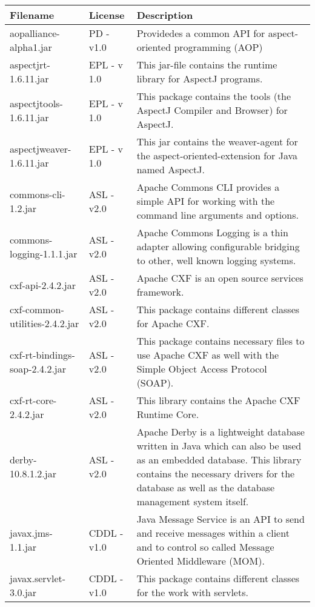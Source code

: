 \begin{center}
\begin{longtable}{|p{}|p{}|p{}|}
\hline 
Filename & License & Description\\
\hline
\hline 
aopalliance-alpha1.jar & PD - v1.0 & Providedes a common API for aspect-oriented programming (AOP)\\
\hline 
aspectjrt-1.6.11.jar & EPL - v 1.0 & This jar-file contains the runtime library for AspectJ programs.\\
\hline 
aspectjtools-1.6.11.jar & EPL - v 1.0 & This package contains the tools (the AspectJ Compiler and Browser) for AspectJ.\\
\hline 
aspectjweaver-1.6.11.jar & EPL - v 1.0 & This jar contains the weaver-agent for the aspect-oriented-extension for Java named AspectJ.\\
\hline 
commons-cli-1.2.jar & ASL - v2.0 & Apache Commons CLI provides a simple API for working with the command line arguments and options.\\
\hline 
commons-logging-1.1.1.jar & ASL - v2.0 & Apache Commons Logging is a thin adapter allowing configurable bridging to other, well known logging systems.\\
\hline 
cxf-api-2.4.2.jar & ASL - v2.0 & Apache CXF is an open source services framework.\\
\hline 
cxf-common-utilities-2.4.2.jar & ASL - v2.0 & This package contains different classes for Apache CXF.\\
\hline 
cxf-rt-bindings-soap-2.4.2.jar & ASL - v2.0 & This package contains necessary files to use Apache CXF as well with the Simple Object Access Protocol (SOAP).\\
\hline 
cxf-rt-core-2.4.2.jar & ASL - v2.0 & This library contains the Apache CXF Runtime Core.\\
\hline 
derby-10.8.1.2.jar & ASL - v2.0 & Apache Derby is a lightweight database written in Java which can also be used as an embedded database. This library contains the necessary drivers for the database as well as the database management system itself.\\
\hline 
javax.jms-1.1.jar & CDDL - v1.0 & Java Message Service is an API to send and receive messages within a client and to control so called Message Oriented Middleware (MOM).\\
\hline 
javax.servlet-3.0.jar & CDDL - v1.0 & This package contains different classes for the work with servlets.\\
\hline 

\end{longtable}
\end{center}
